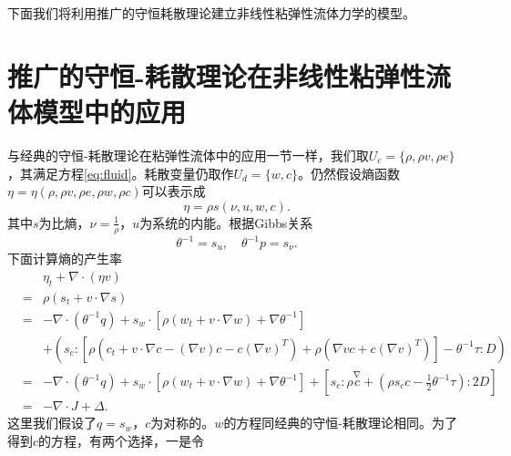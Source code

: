 

下面我们将利用推广的守恒耗散理论建立非线性粘弹性流体力学的模型。

\section{推广的守恒-耗散理论在非线性粘弹性流体模型中的应用}
与经典的守恒-耗散理论在粘弹性流体中的应用一节一样，我们取$U_c = \{ \rho,\rho v,\rho e\}$，其满足方程\eqref{eq:fluid}。耗散变量仍取作$U_d =\{ w,c\}$。仍然假设熵函数$\eta =\eta(\rho,\rho v,\rho e,\rho w,\rho c)$可以表示成
\begin{equation*}
	\eta = \rho s(\nu,u,w,c).
\end{equation*}
其中$s$为比熵，$\nu = \frac{1}{\rho}$，$u$为系统的内能。根据Gibbs关系
\begin{equation*}
		\theta^{-1} = s_u, \quad \theta^{-1} p = s_{\nu}.
\end{equation*}
下面计算熵的产生率
\begin{eqnarray*}
		&&\eta_t + \nabla \cdot (\eta v) \\
		&=& \rho (s_t + v \cdot \nabla s) \\
		&=& -\nabla \cdot (\theta^{-1} q) + s_w \cdot [\rho (w_t + v \cdot \nabla w) + \nabla \theta^{-1}] \\
		&&+ (s_c:[\rho (c_t + v \cdot \nabla c - (\nabla v) c - c (\nabla v)^T) + \rho (\nabla v c + c (\nabla v)^T)] - \theta^{-1} \tau : D) \\
		&=& -\nabla \cdot (\theta^{-1} q) + s_w \cdot [\rho (w_t + v \cdot \nabla w) + \nabla \theta^{-1}] + [ s_c:\rho \stackrel{\nabla}{c} + (\rho s_c c - \frac{1}{2} \theta^{-1} \tau): 2 D]   \\
		&=& -\nabla \cdot J + \Delta.
	\end{eqnarray*}	
	这里我们假设了$q=s_w$，$c$为对称的。$w$的方程同经典的守恒-耗散理论相同。为了得到$c$的方程，有两个选择，一是令
